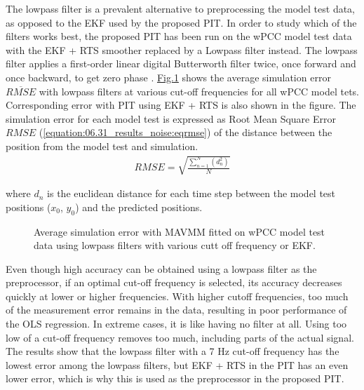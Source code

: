 \documentclass[review]{elsarticle}
\begin{document}
The low\sphinxhyphen{}pass filter is a prevalent alternative to preprocessing the model test data, as opposed to the EKF used by the proposed PIT.
In order to study which of the filters works best, the proposed PIT has been run on the wPCC model test data with the EKF + RTS smoother replaced by a Low\sphinxhyphen{}pass filter instead. The low\sphinxhyphen{}pass filter applies a first-order linear digital Butterworth filter twice, once forward and once backward, to get zero phase \cite{virtanen_scipy_2020}. \hyperref[\detokenize{06.31_results_noise:fig-lowpass-accuracy}]{Fig.\@ \ref{\detokenize{06.31_results_noise:fig-lowpass-accuracy}}} shows the average simulation error \( \overline{RMSE} \) with low\sphinxhyphen{}pass filters at various cut-off frequencies for all wPCC model tets. Corresponding error with PIT using EKF + RTS is also shown in the figure. The simulation error for each model test is expressed as Root Mean Square Error \(RMSE\) (\autoref{equation:06.31_results_noise:eqrmse}) of the distance between the position from the model test and simulation.
\begin{equation}\label{equation:06.31_results_noise:eqrmse}
\begin{split}RMSE=\sqrt{ \frac{\sum_{n=1}^{N} (d_n^2) }{N}} \end{split}
\end{equation}
  
where \(d_n\) is the euclidean distance for each time step between the model test positions (\(x_0\), \(y_0\)) and the predicted positions.

 \begin{figure}[H]
 \centering
 \capstart

 \noindent{}
 \caption{Average simulation error with MAVMM fitted on wPCC model test data using low\sphinxhyphen{}pass filters with various cutt off frequency or EKF.}\label{\detokenize{06.31_results_noise:fig-lowpass-accuracy}}\end{figure}

  
Even though high accuracy can be obtained using a low\sphinxhyphen{}pass filter as the pre\sphinxhyphen{}processor, if an optimal cut-off frequency is selected, its accuracy decreases quickly at lower or higher frequencies. With higher cut\sphinxhyphen{}off frequencies, too much of the measurement error remains in the data, resulting in poor performance of the OLS regression. In extreme cases, it is like having no filter at all. Using too low of a cut-off frequency removes too much, including parts of the actual signal. The results show that the low\sphinxhyphen{}pass filter with a 7 Hz cut-off frequency has the lowest error among the low\sphinxhyphen{}pass filters, but EKF + RTS in the PIT has an even lower error, which is why this is used as the preprocessor in the proposed PIT.
\end{document}

